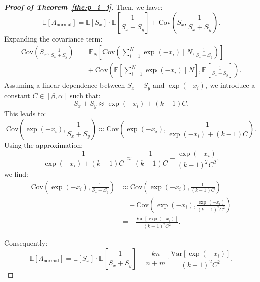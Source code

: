 \begin{proof}[\textbf{Proof of Theorem~\ref{the:p_i_j}}]
    Then, we have:
    \begin{equation*}
        \mathbb{E}[\Lambda_{\text{normal}}] = \mathbb{E}[S_x] \cdot \mathbb{E}\left[\frac{1}{S_x + S_y}\right] + \mathrm{Cov}\left(S_x, \frac{1}{S_x + S_y}\right).
    \end{equation*}
    Expanding the covariance term:
    \begin{equation}
        \begin{aligned}
            \mathrm{Cov}\left(S_x, \frac{1}{S_x + S_y}\right) &= \mathbb{E}_N \left[\mathrm{Cov}\left(\sum_{i=1}^N \exp(-x_i) \mid N, \frac{1}{S_x + S_y}\right)\right] \\ 
            & \quad + \mathrm{Cov}\left(\mathbb{E}\left[\sum_{i=1}^N \exp(-x_i) \mid N\right], \mathbb{E}\left[\frac{1}{S_x + S_y}\right]\right).
        \end{aligned}
    \end{equation}
    Assuming a linear dependence between \( S_x + S_y \) and \( \exp(-x_i) \), we introduce a constant \( C \in [\beta, \alpha] \) such that:
    \begin{equation*}
        S_x + S_y \approx \exp(-x_i) + (k-1)C.
    \end{equation*}
    This leads to:
    \begin{equation*}
        \mathrm{Cov}\left(\exp(-x_i), \frac{1}{S_x + S_y}\right) \approx \mathrm{Cov}\left(\exp(-x_i), \frac{1}{\exp(-x_i) + (k-1)C}\right).
    \end{equation*}
    Using the approximation:
    \begin{equation*}
        \frac{1}{\exp(-x_i) + (k-1)C} \approx \frac{1}{(k-1)C} - \frac{\exp(-x_i)}{(k-1)^2 C^2},
    \end{equation*}
    we find:
    \begin{equation*}
        \begin{aligned}
            \mathrm{Cov}\left(\exp(-x_i), \frac{1}{S_x + S_y}\right) & \approx \mathrm{Cov}\left(\exp(-x_i), \frac{1}{(k-1)C}\right) \\
            & \quad - \mathrm{Cov}\left(\exp(-x_i), \frac{\exp(-x_i)}{(k-1)^2 C^2}\right) \\
            & = - \frac{\mathrm{Var}\left[\exp(-x_i)\right]}{(k-1)^2 C^2}.
        \end{aligned}
    \end{equation*}

    Consequently:
    \begin{equation*}
        \mathbb{E}[\Lambda_{\text{normal}}] = \mathbb{E}[S_x] \cdot \mathbb{E}\left[\frac{1}{S_x + S_y}\right] - \frac{kn}{n+m} \cdot \frac{\mathrm{Var}\left[\exp(-x_i)\right]}{(k-1)^2 C^2}.
    \end{equation*}
    

\end{proof}
